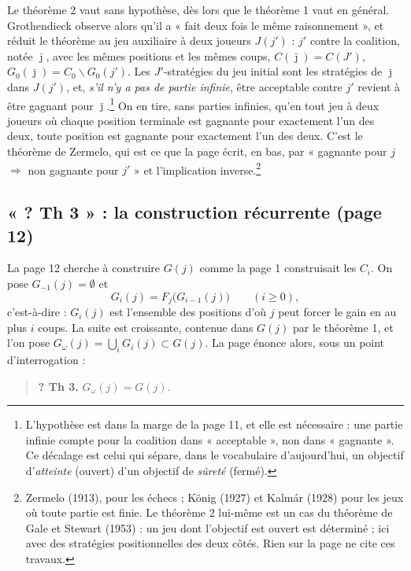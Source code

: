 \documentclass[11pt,a4paper]{article}
\begin{document}
Le théorème 2 vaut sans hypothèse, dès lors que le théorème 1 vaut en
général. Grothendieck observe alors qu'il a « fait deux fois le même
raisonnement », et réduit le théorème au jeu auxiliaire à deux joueurs
$J(j')$ : $j'$ contre la coalition, notée $\bar\jmath$, avec les mêmes
positions et les mêmes coups, $C(\bar\jmath) = C(J')$,
$G_0(\bar\jmath) = C_0 \smallsetminus G_0(j')$. Les $J'$-stratégies du jeu
initial sont les stratégies de $\bar\jmath$ dans $J(j')$, et, \emph{s'il n'y
a pas de partie infinie}, être acceptable contre $j'$ revient à être gagnant
pour $\bar\jmath$.\footnote{L'hypothèse est dans la marge de la page 11, et
elle est nécessaire : une partie infinie compte pour la coalition dans
« acceptable », non dans « gagnante ». Ce décalage est celui qui sépare, dans
le vocabulaire d'aujourd'hui, un objectif d'\emph{atteinte} (ouvert) d'un
objectif de \emph{sûreté} (fermé).} On en tire, sans parties infinies,
qu'en tout jeu à deux joueurs où chaque position terminale est gagnante pour
exactement l'un des deux, toute position est gagnante pour exactement l'un
des deux. C'est le théorème de Zermelo, qui est ce que la page écrit, en
bas, par « gagnante pour $j$ $\Rightarrow$ non gagnante pour $j'$ » et
l'implication inverse.\footnote{Zermelo (1913), pour les échecs ; König
(1927) et Kalmár (1928) pour les jeux où toute partie est finie. Le théorème 2
lui-même est un cas du théorème de Gale et Stewart (1953) : un jeu dont
l'objectif est ouvert est déterminé ; ici avec des stratégies positionnelles
des deux côtés. Rien sur la page ne cite ces travaux.}

\subsection*{« ? Th 3 » : la construction récurrente (page 12)}

La page 12 cherche à construire $G(j)$ comme la page 1 construisait les
$C_i$. On pose $G_{-1}(j) = \emptyset$ et
\[
G_i(j) = F_j\bigl(G_{i-1}(j)\bigr) \qquad (i \geqslant 0),
\]
c'est-à-dire : $G_i(j)$ est l'ensemble des positions d'où $j$ peut forcer le
gain en au plus $i$ coups. La suite est croissante, contenue dans $G(j)$ par
le théorème 1, et l'on pose $G_\omega(j) = \bigcup_i G_i(j) \subset G(j)$.
La page énonce alors, sous un point d'interrogation :

\begin{quote}
\textbf{? Th 3.} $G_\omega(j) = G(j)$.
\end{quote}
\end{document}
